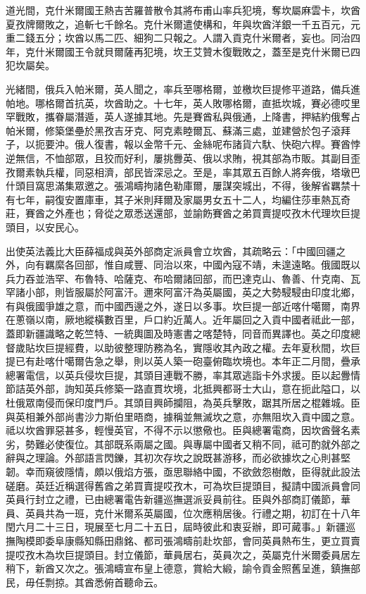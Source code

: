 \begin{pinyinscope}
道光間，克什米爾國王熱吉苦羅普散令其將布甫山率兵犯境，奪坎屬麻雲卡，坎酋夏孜牌爾敗之，追斬七千餘名。克什米爾遣使構和，年與坎酋洋銀一千五百元，元重二錢五分；坎酋以馬二匹、細狗二只報之。人謂入貢克什米爾者，妄也。同治四年，克什米爾國王令就貝爾薩再犯境，坎王艾贊木復戰敗之，蓋至是克什米爾已四犯坎屬矣。

光緒間，俄兵入帕米爾，英人聞之，率兵至哪格爾，並檄坎巨提修平道路，備兵進帕地。哪格爾首抗英，坎酋助之。十七年，英人敗哪格爾，直抵坎城，賽必德哎里罕戰敗，攜眷屬潛遁，英人遂據其地。先是賽酋私與俄通，上降書，押結約俄奪占帕米爾，修築堡壘於黑孜吉牙克、阿克素睦爾瓦、蘇滿三處，並建營於包子滾拜子，以扼要沖。俄人復書，報以金幣千元、金絲呢布諸貨六馱、快砲六桿。賽酋悖逆無信，不恤部眾，且狡而好利，屢挑釁英、俄以求賄，視其部為市販。其副目歪孜爾素執兵權，同惡相濟，部民皆深忌之。至是，率其眾五百餘人將奔俄，塔墩巴什頭目窩思滿集眾邀之。張鴻疇拘諸色勒庫爾，屢謀突城出，不得，後解省羈禁十有七年，嗣復安置庫車，其子米則拜爾及家屬男女五十二人，均編住莎車熱瓦奇莊，賽酋之外產也；脅從之眾悉送還部，並諭飭賽酋之弟買賣提哎孜木代理坎巨提頭目，以安民心。

出使英法義比大臣薛福成與英外部商定派員會立坎酋，其疏略云：「中國回疆之外，向有羈縻各回部，惟自咸豐、同治以來，中國內寇不靖，未遑遠略。俄國既以兵力吞並浩罕、布魯特、哈薩克、布哈爾諸回部，而巴達克山、魯善、什克南、瓦罕諸小部，則皆服屬於阿富汗。邇來阿富汗為英屬國，英之大勢駸駸由印度北鄉，有與俄國爭雄之意，而中國西邊之外，遂日以多事。坎巨提一部近喀什噶爾，南界在蔥嶺以南，厥地縱橫數百里，戶口約近萬人。近年屬回之入貢中國者祗此一部，蓋即新疆識略之乾竺特、一統輿圖及時憲書之喀楚特，同音而異譯也。英之印度總督歲貼坎巨提經費，以助彼整理防務為名，實隱收其內政之權。去年夏秋間，坎巨提已有赴喀什噶爾告急之舉，則以英人築一砲臺俯臨坎境也。本年正二月間，疊承總署電信，以英兵侵坎巨提，其頭目連戰不勝，率其眾逃詣卡外求援。臣以起釁情節詰英外部，詢知英兵修築一路直貫坎境，北抵興都哥士大山，意在扼此隘口，以杜俄眾南侵而保印度門戶。其頭目興師攔阻，為英兵擊敗，踞其所居之棍雜城。臣與英相兼外部尚書沙力斯伯里晤商，據稱並無滅坎之意，亦無阻坎入貢中國之意。祗以坎酋罪惡甚多，輕慢英官，不得不示以懲儆也。臣與總署電商，因坎酋聲名素劣，勢難必使復位。其部既系兩屬之國。與專屬中國者又稍不同，祗可酌就外部之辭與之理論。外部語言閃鑠，其初次存坎之說既甚游移，而必欲據坎之心則甚堅韌。幸而窺彼隱情，頗以俄焰方張，亟思聯絡中國，不欲斂怨樹敵，臣得就此設法磋磨。英廷近稱選得舊酋之弟買賣提哎孜木，可為坎巨提頭目，擬請中國派員會同英員行封立之禮，已由總署電告新疆巡撫選派妥員前往。臣與外部商訂儀節，華員、英員共為一班，克什米爾系英屬國，位次應稍居後。行禮之期，初訂在十八年閏六月二十三日，現展至七月二十五日，屆時彼此和衷妥辦，即可蕆事。」新疆巡撫陶模即委阜康縣知縣田鼎銘、都司張鴻疇前赴坎部，會同英員熱布生，更立買賣提哎孜木為坎巨提頭目。封立儀節，華員居右，英員次之，英屬克什米爾委員居左稍下，新酋又次之。張鴻疇宣布皇上德意，賞給大緞，諭令貢金照舊呈進，鎮撫部民，毋任剽掠。其酋悉俯首聽命云。


\end{pinyinscope}
